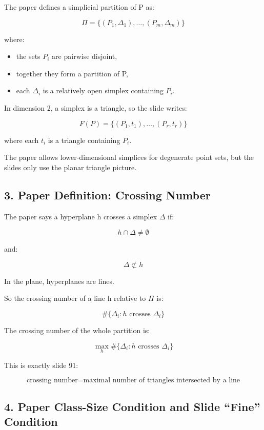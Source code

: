 \documentclass[
  11pt,
]{article}
\providecommand{\tightlist}{%
  \setlength{\itemsep}{0pt}\setlength{\parskip}{0pt}}
\begin{document}
The paper defines a simplicial partition of P as:

\[
\Pi=\lbrace (P_1,\Delta_1),\ldots,(P_m,\Delta_m) \rbrace
\]

where:

\begin{itemize}
\tightlist
\item
  the sets \(P_i\) are pairwise disjoint,
\item
  together they form a partition of P,
\item
  each \(\Delta_i\) is a relatively open simplex containing \(P_i\).
\end{itemize}

In dimension 2, a simplex is a triangle, so the slide writes:

\[
F(P)=\lbrace (P_1,t_1),\ldots,(P_r,t_r) \rbrace
\]

where each \(t_i\) is a triangle containing \(P_i\).

The paper allows lower-dimensional simplices for degenerate point sets,
but the slides only use the planar triangle picture.

\hypertarget{paper-definition-crossing-number}{%
\subsection{3. Paper Definition: Crossing
Number}\label{paper-definition-crossing-number}}

The paper says a hyperplane h crosses a simplex \(\Delta\) if:

\[
h\cap\Delta\ne\emptyset
\]

and:

\[
\Delta\not\subset h
\]

In the plane, hyperplanes are lines.

So the crossing number of a line h relative to \(\Pi\) is:

\[
\#\lbrace \Delta_i:h\text{ crosses }\Delta_i \rbrace
\]

The crossing number of the whole partition is:

\[
\max_h \#\lbrace \Delta_i:h\text{ crosses }\Delta_i \rbrace
\]

This is exactly slide 91:

\[
\text{crossing number}=\text{maximal number of triangles intersected by a line}
\]

\hypertarget{paper-class-size-condition-and-slide-fine-condition}{%
\subsection{4. Paper Class-Size Condition and Slide ``Fine''
Condition}\label{paper-class-size-condition-and-slide-fine-condition}}
\end{document}
